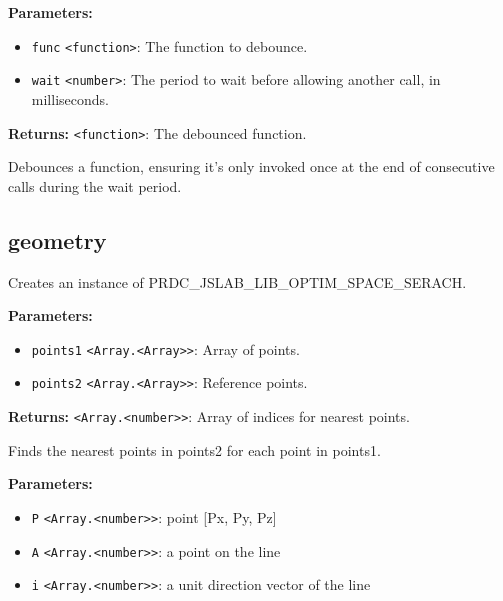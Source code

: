\documentclass[12pt,a4paper]{article}
\begin{document}
\noindent \textbf{Parameters:}
\begin{itemize}
  \item \texttt{func} \texttt{<function>}: The function to debounce.
  \item \texttt{wait} \texttt{<number>}: The period to wait before allowing another call, in milliseconds.
\end{itemize}

\noindent \textbf{Returns:} \texttt{<function>}: The debounced function.

\noindent Debounces a function, ensuring it's only invoked once at the end of consecutive calls during the wait period.


\subsection{geometry}
\vspace{5mm}
\noindent {}


\noindent Creates an instance of PRDC\_JSLAB\_LIB\_OPTIM\_SPACE\_SERACH.

\vspace{5mm}
\noindent {}


\noindent \textbf{Parameters:}
\begin{itemize}
  \item \texttt{points1} \texttt{<Array.<Array>>}: Array of points.
  \item \texttt{points2} \texttt{<Array.<Array>>}: Reference points.
\end{itemize}

\noindent \textbf{Returns:} \texttt{<Array.<number>>}: Array of indices for nearest points.

\noindent Finds the nearest points in points2 for each point in points1.

\vspace{5mm}
\noindent {}


\noindent \textbf{Parameters:}
\begin{itemize}
  \item \texttt{P} \texttt{<Array.<number>>}: point [Px, Py, Pz]
  \item \texttt{A} \texttt{<Array.<number>>}: a point on the line
  \item \texttt{i} \texttt{<Array.<number>>}: a unit direction vector of the line
\end{itemize}
\end{document}
